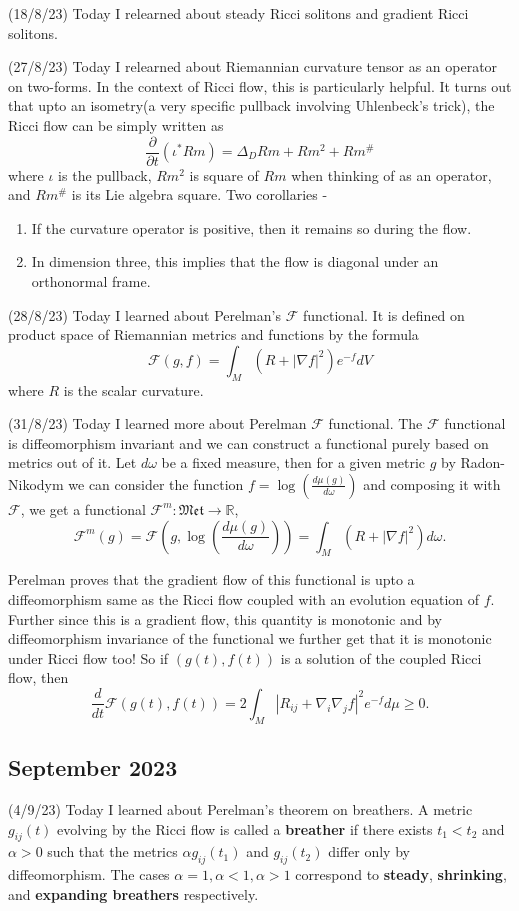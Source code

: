 \documentclass[12pt,a4paper]{article}
\newcommand{\R}{\mathbb{R}}
\begin{document}
(18/8/23) Today I relearned about steady Ricci solitons and gradient Ricci solitons. 

(27/8/23) Today I relearned about Riemannian curvature tensor as an operator on two-forms. In the context of Ricci flow, this is particularly helpful. It turns out that upto an isometry(a very specific pullback involving Uhlenbeck's trick), the Ricci flow can be simply written as 
\[ \frac{\partial}{\partial t}(\iota^{*}Rm)  = \Delta_{D}Rm + Rm^{2}+ Rm^{\#}\]
where $ \iota $ is the pullback, $ Rm^{2} $ is square of $ Rm $ when thinking of as an operator, and $ Rm^{\#} $ is its Lie algebra square. Two corollaries -  \begin{enumerate}
   \item If the curvature operator is positive, then it remains so during the flow.
   \item In dimension three, this implies that the flow is diagonal under an orthonormal frame.
\end{enumerate}
(28/8/23) Today I learned about Perelman's $ \mathcal{F} $ functional. It is defined on product space of Riemannian metrics and functions by the formula 
\[ \mathcal{F}(g,f) = \int_{M}(R+ |\nabla f|^{2})e^{-f}dV \]
where $ R $ is the scalar curvature.

(31/8/23) Today I learned more about Perelman $ \mathcal{F} $  functional. The $ \mathcal{F} $ functional is diffeomorphism invariant and we can construct a functional purely based on metrics out of it. Let $ d \omega $ be a fixed measure, then for a given metric $ g $ by Radon-Nikodym we can consider the function $ f = \log ( \frac{d \mu(g)}{d \omega}) $ and composing it with $ \mathcal{F} $, we get a functional $ \mathcal{F}^{m} : \mathfrak{Met} \to \R $, 
\[ \mathcal{F}^{m}(g) = \mathcal{F}\left(g, \log \left( \frac{d \mu(g)}{d \omega}\right)\right) = \int_{M} (R+|\nabla f|^{2})d \omega. \]

Perelman proves that the gradient flow of this functional is upto a diffeomorphism same as the Ricci flow coupled with an evolution equation of $ f $. Further since this is a gradient flow, this quantity is monotonic and by diffeomorphism invariance of the functional we further get that it is monotonic under Ricci flow too! So if $ (g(t),f(t)) $ is a solution of the coupled Ricci flow, then 
\[ \frac{d}{dt} \mathcal{F}(g(t),f(t)) = 2 \int_{M} |R_{ij}+ \nabla_{i}\nabla_{j}f|^{2} e^{-f}d \mu \ge 0. \]

\subsection*{September 2023}
\quad (4/9/23) Today I learned about Perelman's theorem on breathers. A metric $ g_{ij}(t) $ evolving by the Ricci flow is called a \textbf{breather} if there exists $ t_{1}< t_{2} $ and $ \alpha >0 $ such that the metrics $ \alpha g_{ij}(t_{1}) $ and $ g_{ij}(t_{2}) $ differ only by diffeomorphism. The cases $ \alpha =1, \alpha <1, \alpha >1 $ correspond to \textbf{steady}, \textbf{shrinking}, and \textbf{expanding breathers} respectively. 
\end{document}
